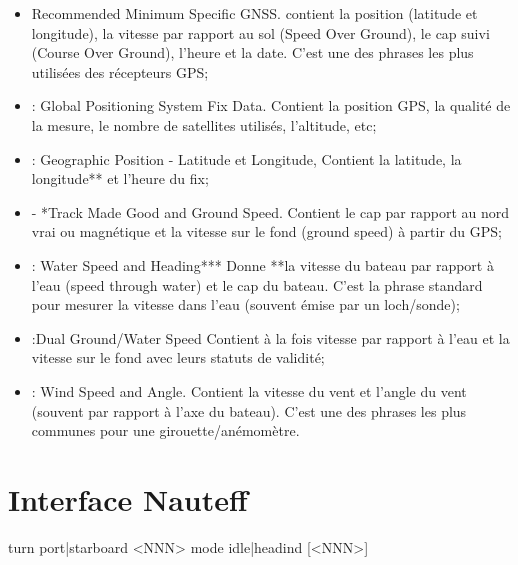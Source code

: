\documentclass[a4paper,11pt]{report}
\begin{document}
\begin{itemize}

	\item[RMC]  Recommended Minimum Specific GNSS. 
	contient  la position (latitude et longitude),
	la vitesse par rapport au sol (Speed Over Ground),
	le cap suivi (Course Over Ground),
	l’heure et la date. C’est une des phrases les plus utilisées des récepteurs GPS;

    \item[GGA]: Global Positioning System Fix Data. 
    Contient la position GPS, la qualité de la mesure,
    le nombre de satellites utilisés,
    l'altitude, etc;

    \item [GLL]: Geographic Position - Latitude et Longitude,
    Contient la latitude, la longitude** et l'heure du fix;

    \item [VTG] - *Track Made Good and Ground Speed. 
    Contient le cap par rapport au nord vrai ou magnétique
    et la vitesse sur le fond (ground speed) à partir du GPS;

    \item[VHW] : Water Speed and Heading***
     Donne **la vitesse du bateau par rapport à l’eau (speed through water) et
     le cap du bateau. C’est la phrase standard pour mesurer la vitesse dans l’eau (souvent émise par un loch/sonde);

    \item[VBW] :Dual Ground/Water Speed
    Contient à la fois vitesse par rapport à l’eau et
    la vitesse sur le fond avec leurs statuts de validité;

    \item[MWV] : Wind Speed and Angle.
     Contient la vitesse du vent et l’angle du vent (souvent par rapport à l’axe du bateau).
     C’est une des phrases les plus communes pour une girouette/anémomètre.

\end{itemize}

\section{Interface Nauteff}


turn port|starboard <NNN>
mode idle|headind [<NNN>]
\end{document}

